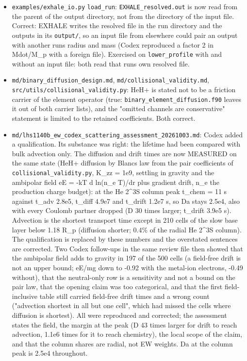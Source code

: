 \documentclass[english,a4paper]{my_memo}
\providecommand{\tightlist}{\setlength{\itemsep}{0pt}\setlength{\parskip}{0pt}}
\begin{document}
\begin{itemize}
\tightlist
\item
  \texttt{examples/exhale\_io.py} \texttt{load\_run}: \texttt{EXHALE\_resolved.out} is now read from
  the parent of the output directory, not from the directory of the input
  file. Correct: EXHALE writes the resolved file in the run directory and
  the outputs in its \texttt{output/}, so an input file from elsewhere could pair
  an output with another run\textquotesingle s radius and mass (Codex reproduced a factor 2
  in Mdot/M\_p with a foreign file). Exercised on \texttt{lower\_profile} with and
  without an input file: both read that run\textquotesingle s own resolved file.
\item
  \texttt{md/binary\_diffusion\_design.md}, \texttt{md/collisional\_validity.md},
  \texttt{src/utils/collisional\_validity.py}: HeH+ is stated not to be a friction
  carrier of the element operator (true: \texttt{binary\_element\_diffusion.f90}
  leaves it out of both carrier lists), and the "omitted channels are
  conservative" statement is limited to the retained coefficients. Both
  correct.
\item
  \texttt{md/lhs1140b\_ew\_codex\_scattering\_assessment\_20261003.md}: Codex added a
  qualification. Its substance was right: the lifetime had been compared
  with bulk advection only. The diffusion and drift times are now MEASURED
  on the same state (HeH+ diffusion by Blanc\textquotesingle s law from the pair
  coefficients of \texttt{collisional\_validity.py}, K\_zz = 1e9, settling in
  gravity and the ambipolar field eE = -kT d ln(n\_e T)/dr plus gradient
  drift, n\_e the production charge budget): at the He 2\^{}3S column peak
  t\_chem = 11 s against t\_adv 2.8e5, t\_diff 4.9e7 and t\_drift 1.2e7 s, so
  Da stays 2.5e4, also with every Coulomb partner dropped (D 30 times
  larger; t\_drift 3.9e5 s). Advection is the shortest transport time except
  in 210 cells of the slow base layer below 1.18 R\_p (diffusion shorter;
  0.4\% of the radial He 2\^{}3S column). The qualification is replaced by these
  numbers and the overstated sentences are corrected.
  Two Codex follow-ups in the same review file then showed that the
  ambipolar field adds to gravity in 197 of the 500 cells (a field-free
  drift is not an upper bound; eE/mg down to -0.92 with the metal-ion
  electrons, -0.49 without), that the neutral-only row is a sensitivity and
  not a bound on the pair law, that the opening claim was too categorical,
  and that the first field-inclusive table still carried field-free drift
  times and a wrong count ("advection shortest in all but one cell", which
  had missed the cells where diffusion is shortest). All were reproduced and
  corrected; the assessment states the field, the margin at the peak (D 43
  times larger for drift to reach advection, 1.1e6 times for it to reach
  chemistry), the local scope of the claim, and that the column shares are
  radial, not EW weights. Da at the column peak is 2.5e4 throughout.
\end{itemize}
\end{document}
